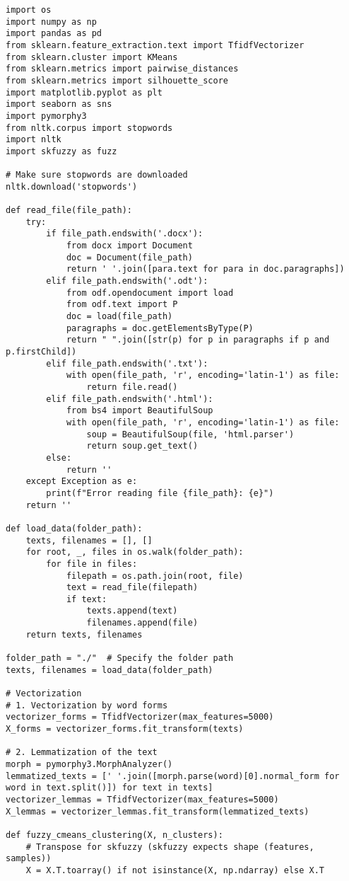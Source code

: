 \begin{lstlisting}[label=lst:1,caption= Сравнение алгоритмов кластеризации K-Means и K-Medoids]
import os
import numpy as np
import pandas as pd
from sklearn.feature_extraction.text import TfidfVectorizer
from sklearn.cluster import KMeans
from sklearn.metrics import pairwise_distances
from sklearn.metrics import silhouette_score
import matplotlib.pyplot as plt
import seaborn as sns
import pymorphy3
from nltk.corpus import stopwords
import nltk
import skfuzzy as fuzz

# Make sure stopwords are downloaded
nltk.download('stopwords')

def read_file(file_path):
	try:
		if file_path.endswith('.docx'):
			from docx import Document
			doc = Document(file_path)
			return ' '.join([para.text for para in doc.paragraphs])
		elif file_path.endswith('.odt'):
			from odf.opendocument import load
			from odf.text import P
			doc = load(file_path)
			paragraphs = doc.getElementsByType(P)
			return " ".join([str(p) for p in paragraphs if p and p.firstChild])
		elif file_path.endswith('.txt'):
			with open(file_path, 'r', encoding='latin-1') as file:
				return file.read()
		elif file_path.endswith('.html'):
			from bs4 import BeautifulSoup
			with open(file_path, 'r', encoding='latin-1') as file:
				soup = BeautifulSoup(file, 'html.parser')
				return soup.get_text()
		else:
			return ''
	except Exception as e:
		print(f"Error reading file {file_path}: {e}")
	return ''

def load_data(folder_path):
	texts, filenames = [], []
	for root, _, files in os.walk(folder_path):
		for file in files:
			filepath = os.path.join(root, file)
			text = read_file(filepath)
			if text:
				texts.append(text)
				filenames.append(file)
	return texts, filenames

folder_path = "./"  # Specify the folder path
texts, filenames = load_data(folder_path)

# Vectorization
# 1. Vectorization by word forms
vectorizer_forms = TfidfVectorizer(max_features=5000)
X_forms = vectorizer_forms.fit_transform(texts)

# 2. Lemmatization of the text
morph = pymorphy3.MorphAnalyzer()
lemmatized_texts = [' '.join([morph.parse(word)[0].normal_form for word in text.split()]) for text in texts]
vectorizer_lemmas = TfidfVectorizer(max_features=5000)
X_lemmas = vectorizer_lemmas.fit_transform(lemmatized_texts)

def fuzzy_cmeans_clustering(X, n_clusters):
	# Transpose for skfuzzy (skfuzzy expects shape (features, samples))
	X = X.T.toarray() if not isinstance(X, np.ndarray) else X.T
	

\end{lstlisting}
